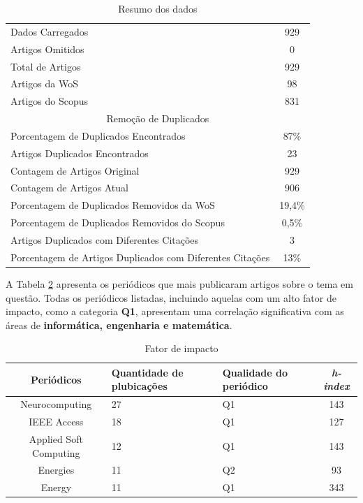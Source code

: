 \begin{table}[tb]
	\centering
	\caption{Resumo dos dados}
	\label{tab:resumo}
	\begin{tabular}{lc}
		\hline
		Dados Carregados & 929 \\
		Artigos Omitidos & 0 \\
		Total de Artigos & 929 \\
		Artigos da WoS & 98 \\
		Artigos do Scopus & 831 \\
		\hline
		\multicolumn{2}{c}{Remoção de Duplicados} \\
		\hline
		Porcentagem de Duplicados Encontrados & 87\% \\
		Artigos Duplicados Encontrados & 23 \\
		Contagem de Artigos Original & 929 \\
		Contagem de Artigos Atual & 906 \\
		Porcentagem de Duplicados Removidos da WoS & 19,4\% \\
		Porcentagem de Duplicados Removidos do Scopus & 0,5\% \\
		Artigos Duplicados com Diferentes Citações & 3 \\
		Porcentagem de Artigos Duplicados com Diferentes Citações & 13\% \\
		\hline
	\end{tabular}
	
	 
\end{table}


A Tabela \ref{tb2} apresenta os periódicos que mais publicaram artigos sobre o tema em questão. Todas os periódicos listadas, incluindo aquelas com um alto fator de impacto, como a categoria \textbf{Q1}, apresentam uma correlação significativa com as áreas de \textbf{informática, engenharia e matemática}.

\begin{table}[tb]
	\centering
	\caption{Fator de impacto}\label{tb2}
	\begin{tabular}{@{}cp{3cm}p{3cm}c@{}}
		\toprule
		Periódicos      & Quantidade de plubicações & Qualidade do periódico & \textit{h-index} \\\midrule
		Neurocomputing         & 27                         & Q1                     & 143     \\
		IEEE Access            & 18                         & Q1                     & 127     \\
		Applied Soft Computing & 12                         & Q1                     & 143     \\
		Energies               & 11                         & Q2                     & 93      \\
		Energy                 & 11                         & Q1                     & 343     \\ \bottomrule
	\end{tabular}
	
	
	
\end{table}

